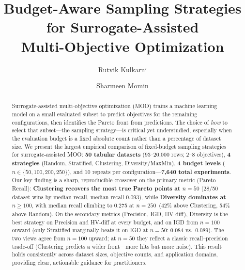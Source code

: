 \documentclass[sigconf,nonacm]{acmart}
\begin{document}
\title{Budget-Aware Sampling Strategies for Surrogate-Assisted\\
       Multi-Objective Optimization}

\author{Rutvik Kulkarni}

\author{Sharmeen Momin}

\begin{abstract}
Surrogate-assisted multi-objective optimization (MOO) trains a machine learning
model on a small evaluated subset to predict objectives for the remaining
configurations, then identifies the Pareto front from predictions.
The choice of \emph{how} to select that subset---the sampling strategy---is
critical yet understudied, especially when the evaluation budget is a fixed
absolute count rather than a percentage of dataset size.
We present the largest empirical comparison of fixed-budget sampling strategies
for surrogate-assisted MOO: \textbf{50 tabular datasets} (93--20,000 rows;
2--8 objectives), \textbf{4 strategies} (Random, Stratified, Clustering,
Diversity/MaxMin), \textbf{4 budget levels} ($n \in \{50, 100, 200, 250\}$),
and 10 repeats per configuration---\textbf{7,640 total experiments}.
Our key finding is a sharp, reproducible crossover on the primary metric
(Pareto Recall):
\textbf{Clustering recovers the most true Pareto points at $n=50$}
(28/50 dataset wins by median recall, median recall 0.093), while
\textbf{Diversity dominates at $n \geq 100$}, with median recall climbing to
0.275 at $n=250$~(42\% above Clustering, 54\% above Random).
On the secondary metrics (Precision, IGD, HV-diff), Diversity is the best
strategy on Precision and HV-diff at every budget, and on IGD from $n=100$
onward (only Stratified marginally beats it on IGD at $n=50$:
0.084 vs.\ 0.089).
The two views agree from $n=100$ upward; at $n=50$ they reflect a classic
recall--precision trade-off (Clustering predicts a wider front---more hits
but more noise).
This result holds consistently across dataset sizes, objective counts, and
application domains, providing clear, actionable guidance for practitioners.
\end{abstract}
\end{document}
